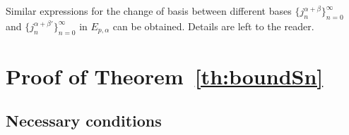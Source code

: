 \documentclass[reqno]{amsart}
\theoremstyle{plain}
\theoremstyle{definition}
\theoremstyle{remark}
\begin{document}
Similar expressions for the change of basis between different bases
$\{j_n^{\alpha+\beta}\}_{n=0}^\infty$ and
$\{j_n^{\alpha+\beta'}\}_{n=0}^\infty$ in $E_{p,\alpha}$ can be obtained.
Details are left to the reader.

\section{Proof of Theorem~\ref{th:boundSn}}
\label{sec:proofboundSn}

\subsection{Necessary conditions}
\end{document}
